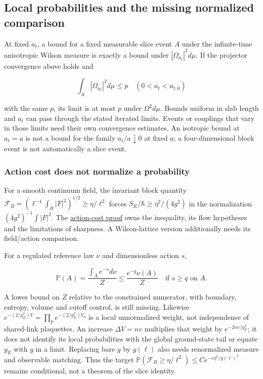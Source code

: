 \documentclass[11pt,a4paper]{article}
\begin{document}
\hypertarget{local-probabilities-and-the-missing-normalized-comparison}{%
\subsection{Local probabilities and the missing normalized
comparison}\label{local-probabilities-and-the-missing-normalized-comparison}}

At fixed \(a_t\), a bound for a fixed measurable slice event \(A\) under
the infinite-time anisotropic Wilson measure is exactly a bound under
\(|\Omega_{a_t}|^2d\mu\). If the projector convergence above holds and

\[\int_A|\Omega_{a_t}|^2d\mu\le p\quad(0<a_t<a_{t,0})\]

with the same \(p\), its limit is at most \(p\) under \(\Omega^2d\mu\).
Bounds uniform in slab length and \(a_t\) can pass through the stated
iterated limits. Events or couplings that vary in those limits need
their own convergence estimates. An isotropic bound at \(a_t=a\) is not
a bound for the family \(a_t/a\downarrow0\) at fixed \(a\); a
four-dimensional block event is not automatically a slice event.

\hypertarget{action-cost-does-not-normalize-a-probability}{%
\subsubsection{Action cost does not normalize a
probability}\label{action-cost-does-not-normalize-a-probability}}

For a smooth continuum field, the invariant block quantity
\(\mathcal F_B=(\ell^{-4}\int_B|F|^2)^{1/2}\ge\eta/\ell^2\) forces
\(S_E/\hbar\ge\eta^2/(4g^2)\) in the normalization
\((4g^2)^{-1}\int|F|^2\). The
\href{large-field-action-lower-bound.md}{action-cost proof} owns the
inequality, its flow hypotheses and the limitations of sharpness. A
Wilson-lattice version additionally needs its field/action comparison.

For a regulated reference law \(\nu\) and dimensionless action \(s\),

\[\mathbb P(A)=\frac{\int_Ae^{-s}d\nu}{Z}
 \le\frac{e^{-q}\nu(A)}Z\quad\text{if }s\ge q\text{ on }A.\]

A lower bound on \(Z\) relative to the constrained numerator, with
boundary, entropy, volume and cutoff control, is still missing. Likewise
\(e^{-(2/g_E^2)V}=\prod_pe^{-(2/g_E^2)V_p}\) is a local unnormalized
weight, not independence of shared-link plaquettes. An increase
\(\Delta V=nv\) multiplies that weight by \(e^{-2nv/g_E^2}\); it does
not identify its local probabilities with the global ground-state tail
or equate \(g_E\) with \(g\) in a limit. Replacing bare \(g\) by
\(g(\ell)\) also needs renormalized measure and observable matching.
Thus the target
\(\mathbb P(\mathcal F_B\ge\eta/\ell^2)\le C e^{-c\eta^2/g(\ell)^2}\)
remains conditional, not a theorem of the slice identity.
\end{document}
